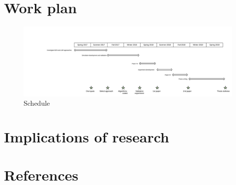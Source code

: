 \documentclass[a4paper,11pt]{article}
\numberwithin{equation}{section}
\begin{document}
\section{Work plan}
\begin{figure}
 \caption{Schedule}
 \centering
   \includegraphics[width=\textwidth]{ThesisSchedule}
\end{figure}

\section{Implications of research}

\section{References}
\end{document}
